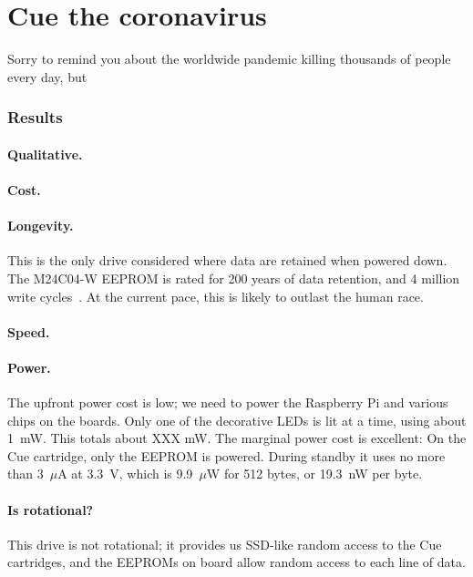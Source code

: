\documentclass[twocolumn]{article}
\begin{document}
\section{Cue the coronavirus} \label{sec:cue}

Sorry to remind you about the worldwide pandemic killing thousands of
people every day, but

\subsubsection{Results}

\paragraph{Qualitative.} 

\paragraph{Cost.}

\paragraph{Longevity.} This is the only drive considered where data
are retained when powered down. The M24C04-W EEPROM is rated for 200
years of data retention, and 4 million write cycles~\cite{stm24c0w}.
At the current pace, this is likely to outlast the human race.

\paragraph{Speed.} 

\paragraph{Power.} The upfront power cost is low; we need to power
the Raspberry Pi and various chips on the boards. Only one of the
decorative LEDs is lit at a time, using about 1~mW. This totals about
XXX mW.
The marginal power cost is excellent: On the Cue cartridge, only the
EEPROM is powered. During standby it uses no more than 3~$\mu$A at
3.3~V, which is 9.9~$\mu$W for 512 bytes, or 19.3~nW per byte.

\paragraph{Is rotational?} This drive is not rotational; it provides
us SSD-like random access to the Cue cartridges, and the EEPROMs on
board allow random access to each line of data.
\end{document}
